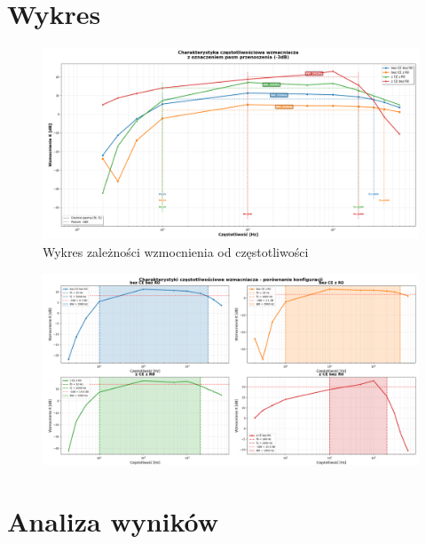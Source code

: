 \documentclass[11pt]{article}
\begin{document}
\clearpage
\section*{Wykres}
\begin{figure}[H]
    \centering
    \includegraphics[width=1\textwidth]{wzmacniaczImpr.png}
    \caption{Wykres zależności wzmocnienia od częstotliwości}
    \label{fig:wzmacniacz}
\end{figure}

\begin{figure}
    \centering
    \includegraphics[width=1\textwidth]{wykresy osobno.png}
    \label{fig:wzmacniacz2}
\end{figure}

\section*{Analiza wyników}

\end{document}
